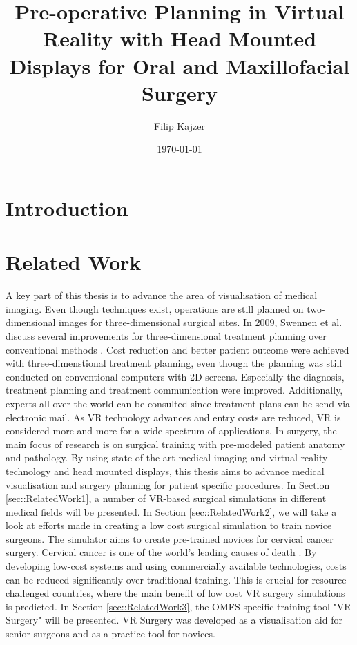 \documentclass[twoside, parskip]{VRThesis} %
\title{Pre-operative Planning in Virtual Reality with Head Mounted Displays for Oral and Maxillofacial Surgery}
\author{Filip Kajzer}
\date{\today}
\begin{document}
\maketitle
\makecoverMaster %
\maketitleMaster %

\makestatement

\tableofcontents

\chapter{Introduction}



\chapter{Related Work}

A key part of this thesis is to advance the area of visualisation of medical imaging.
Even though techniques exist, operations are still planned on two-dimensional images for three-dimensional surgical sites.
In 2009, Swennen et al. discuss several improvements for three-dimensional treatment planning over conventional methods \cite{swennen2009three}.
Cost reduction and better patient outcome were achieved with three-dimenstional treatment planning, even though the planning was still conducted on conventional computers with 2D screens.
Especially the diagnosis, treatment planning and treatment communication were improved.
Additionally, experts all over the world can be consulted since treatment plans can be send via electronic mail.
As VR technology advances and entry costs are reduced, VR is considered more and more for a wide spectrum of applications.
In surgery, the main focus of research is on surgical training with pre-modeled patient anatomy and pathology.
By using state-of-the-art medical imaging and virtual reality technology and head mounted displays, this thesis aims to advance medical visualisation and surgery planning for patient specific procedures.
In Section \ref{sec::RelatedWork1}, a number of VR-based surgical simulations in different medical fields will be presented.
In Section \ref{sec::RelatedWork2}, we will take a look at efforts made in creating a low cost surgical simulation to train novice surgeons.
The simulator aims to create pre-trained novices for cervical cancer surgery. 
Cervical cancer is one of the world's leading causes of death \cite{RN52}.
By developing low-cost systems and using commercially available technologies, costs can be reduced significantly over traditional training.
This is crucial for resource-challenged countries, where the main benefit of low cost VR surgery simulations is predicted.
In Section \ref{sec::RelatedWork3}, the OMFS specific training tool "VR Surgery" will be presented.
VR Surgery was developed as a visualisation aid for senior surgeons and as a practice tool for novices.   
\end{document}
